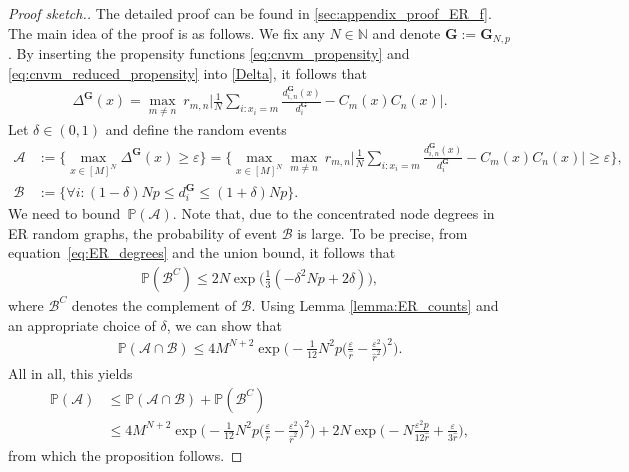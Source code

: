 \documentclass[a4paper,
               10pt,
               pdftex,
               normalheadings,
               headsepline,
               footsepline,
               headinclude,
               footinclude,
               DIV=14,
               abstracton]
{scrartcl}
\newcommand{\rv}[1]{\bm{#1}}
\begin{document}
\begin{proof}[Proof sketch.]
The detailed proof can be found in \cref{sec:appendix_proof_ER_f}. The main idea of the proof is as follows.
We fix any $N \in \mathbb{N}$ and denote $\rv{G} := \rv{G}_{N,p}$.
By inserting the propensity functions \eqref{eq:cnvm_propensity} and \eqref{eq:cnvm_reduced_propensity} into \eqref{Delta}, it follows that
\begin{align}
    \Delta^{\rv{G}}(x) = \max_{m\neq n}\  r_{m,n} \Big\lvert \frac{1}{N} \sum_{i : x_{i} = m} \frac{d^{\rv{G}}_{i,n}(x)}{d^{\rv{G}}_i} - C_m(x) C_n(x) \Big\rvert.
\end{align}
    Let $\delta \in (0,1)$ and define the random events
    \begin{align}
        \mathcal{A} &:= \Big\{ \max_{x\in [M]^{N}} \Delta^{\rv{G}}(x) \geq \varepsilon \Big\} = \Big\{ \max_{x\in [M]^{N}} \max_{m \neq n}\ r_{m,n} \Big\lvert \frac{1}{N} \sum_{i : x_{i} = m} \frac{d^{\rv{G}}_{i,n}(x)}{d^{\rv{G}}_i} - C_m(x) C_n(x) \Big\rvert \geq \varepsilon \Big\},\\
        \mathcal{B} &:= \Big\{ \forall i: (1-\delta)Np \leq d^{\rv{G}}_i \leq (1+\delta)Np\Big\}.
    \end{align}
    We need to bound~$\mathbb{P}(\mathcal{A})$. Note that, due to the concentrated node degrees in ER random graphs, the probability of event $\mathcal{B}$ is large. To be precise, from equation~\eqref{eq:ER_degrees} and the union bound, it follows that
    \begin{align}
        \mathbb{P}(\mathcal{B}^C) \leq 2 N \exp\Big(\frac{1}{3} (-\delta^2 N p + 2 \delta)\Big),
    \end{align}
    where $\mathcal{B}^C$ denotes the complement of $\mathcal{B}$.
    Using Lemma \ref{lemma:ER_counts} and an appropriate choice of $\delta$, we can show that
    \begin{align}
        \mathbb{P}(\mathcal{A} \cap \mathcal{B}) \leq 4 M^{N+2} \exp\Big(-\frac{1}{12} N^2 p \Big(\frac{\varepsilon}{\hat{r}} - \frac{\varepsilon^2}{\hat{r}^2}\Big)^2 \Big).
    \end{align}
    All in all, this yields
    \begin{align}
         \mathbb{P}(\mathcal{A}) &\leq \mathbb{P}(\mathcal{A} \cap \mathcal{B}) + \mathbb{P}(\mathcal{B}^C)\\
        &\leq 4 M^{N+2} \exp\Big(-\frac{1}{12} N^2 p \Big(\frac{\varepsilon}{\hat{r}} - \frac{\varepsilon^2}{\hat{r}^2}\Big)^2 \Big) + 2 N \exp\Big(-N \frac{\varepsilon^2 p}{12 \hat{r}} + \frac{ \varepsilon}{3\hat{r}}\Big),
    \end{align}
    from which the proposition follows.
\end{proof}
\end{document}
